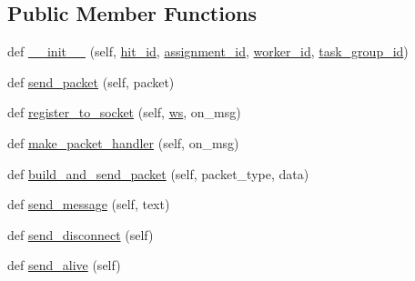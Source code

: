 \subsection*{Public Member Functions}
\begin{DoxyCompactItemize}
\item 
def \hyperlink{classparlai_1_1mturk_1_1core_1_1dev_1_1test_1_1test__socket__manager_1_1MockAgent_a485fec8967608a1c95fabee6bfe7873a}{\+\_\+\+\_\+init\+\_\+\+\_\+} (self, \hyperlink{classparlai_1_1mturk_1_1core_1_1dev_1_1test_1_1test__socket__manager_1_1MockAgent_a0aedeb9d62656383763abbf154857c37}{hit\+\_\+id}, \hyperlink{classparlai_1_1mturk_1_1core_1_1dev_1_1test_1_1test__socket__manager_1_1MockAgent_af44235241bced0c401cd8fef3252a0a4}{assignment\+\_\+id}, \hyperlink{classparlai_1_1mturk_1_1core_1_1dev_1_1test_1_1test__socket__manager_1_1MockAgent_adabb3feeb1730f04d80f84c855d86200}{worker\+\_\+id}, \hyperlink{classparlai_1_1mturk_1_1core_1_1dev_1_1test_1_1test__socket__manager_1_1MockAgent_abbdca65743dccef13d2168f4904f1bf8}{task\+\_\+group\+\_\+id})
\item 
def \hyperlink{classparlai_1_1mturk_1_1core_1_1dev_1_1test_1_1test__socket__manager_1_1MockAgent_a5f06298a6f48e04c3b5fc3412232f0dc}{send\+\_\+packet} (self, packet)
\item 
def \hyperlink{classparlai_1_1mturk_1_1core_1_1dev_1_1test_1_1test__socket__manager_1_1MockAgent_a1eeabaf756b6545e416829d002778006}{register\+\_\+to\+\_\+socket} (self, \hyperlink{classparlai_1_1mturk_1_1core_1_1dev_1_1test_1_1test__socket__manager_1_1MockAgent_a4b3ec6c638cfe8095425ddab95a69cac}{ws}, on\+\_\+msg)
\item 
def \hyperlink{classparlai_1_1mturk_1_1core_1_1dev_1_1test_1_1test__socket__manager_1_1MockAgent_ae9001fc0af7cfd2bf69429e88099149c}{make\+\_\+packet\+\_\+handler} (self, on\+\_\+msg)
\item 
def \hyperlink{classparlai_1_1mturk_1_1core_1_1dev_1_1test_1_1test__socket__manager_1_1MockAgent_a2add2b3e4edb6587b92db6bb6fe5c069}{build\+\_\+and\+\_\+send\+\_\+packet} (self, packet\+\_\+type, data)
\item 
def \hyperlink{classparlai_1_1mturk_1_1core_1_1dev_1_1test_1_1test__socket__manager_1_1MockAgent_a0e22c9a64a4c8cefe48c673c16917ba8}{send\+\_\+message} (self, text)
\item 
def \hyperlink{classparlai_1_1mturk_1_1core_1_1dev_1_1test_1_1test__socket__manager_1_1MockAgent_ac4626723af7b420e59f2624b45684411}{send\+\_\+disconnect} (self)
\item 
def \hyperlink{classparlai_1_1mturk_1_1core_1_1dev_1_1test_1_1test__socket__manager_1_1MockAgent_aa6b3ec5ae40ee38cb6114ee0f6bba21e}{send\+\_\+alive} (self)
\end{DoxyCompactItemize}
